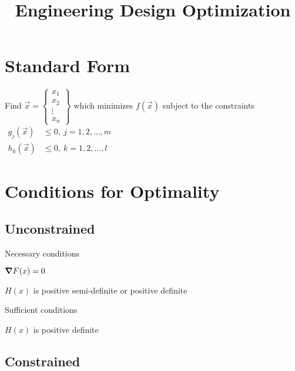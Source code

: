 \documentclass{article}
\title{Engineering Design Optimization}
\begin{document}


\section{Standard Form}\label{sec:standard-form}

Find \(\vec{x} =
\begin{Bmatrix}
  x_1 \\
  x_2 \\
  \vdots \\
  x_n
\end{Bmatrix}\)
which minimizes \(f(\vec{x})\) subject to the constraints
\(\begin{aligned}
  g_j(\vec{x}) &\le 0, \ j = 1, 2, \dots, m \\
  h_k(\vec{x}) &\le 0, \ k = 1, 2, \dots, l
\end{aligned}\)

\section{Conditions for Optimality}\label{sec:conditions-optimality}

\subsection{Unconstrained}\label{sec:unconstrained-conditions}

\begin{description*}
  \item[Necessary conditions]~
    \begin{itemize*}
      \item \(\bm{\nabla} F(x) = 0\)
      \item \(H(x)\) is positive semi-definite or positive definite
    \end{itemize*}
  \item[Sufficient conditions]~
    \begin{itemize*}
      \item \(H(x)\) is positive definite
    \end{itemize*}
\end{description*}

\subsection{Constrained}\label{sec:constrained-conditions}
\end{document}
